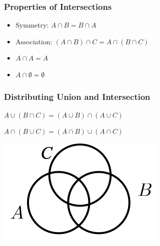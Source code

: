 \documentclass[12pt, block=fill]{beamer}
\begin{document}
\begin{frame}
  \frametitle{Properties of Intersections}
  \begin{itemize}
  \item Symmetry: $A \cap B = B \cap A$
  \item Association: $(A \cap B) \cap C = A \cap (B \cap C)$
  \item $A \cap A = A$
  \item $A \cap \emptyset = \emptyset$
  \end{itemize}
\end{frame}


\begin{frame}
  \frametitle{Distributing Union and Intersection}
  
  \begin{minipage}[t]{0.6\textwidth}
    \vspace{0pt}
    
    $A \cup (B \cap C) = (A \cup B) \cap (A \cup C)$
    
    \vspace{2cm}
    $A \cap (B \cup C) = (A \cap B) \cup (A \cap C)$
    
  \end{minipage}%
  \hfill
  \begin{minipage}[t]{0.4\textwidth}
    \vspace{-5pt}
    \center  \includegraphics[width=\linewidth]{figures/abc}
  \end{minipage}  
  
\end{frame}
\end{document}
